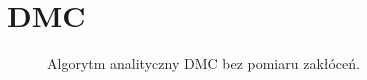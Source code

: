 \chapter{DMC}

\begin{figure}[h!]
\centering
{}
\hfill
{}
\caption{Algorytm analityczny DMC bez pomiaru zakłóceń.}
\end{figure}

\newpage

